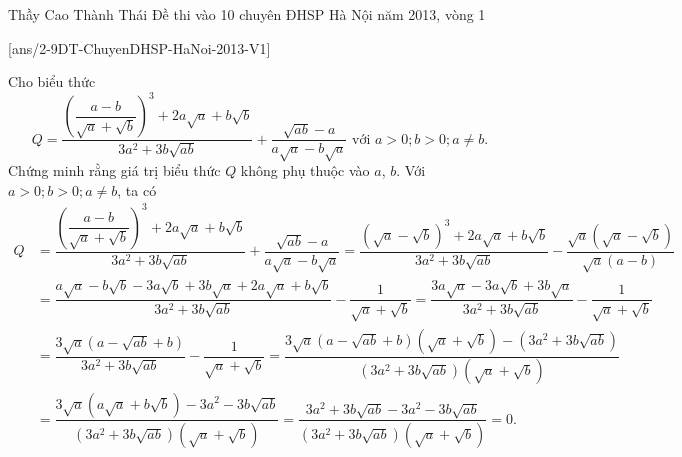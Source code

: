 
\begin{name}
{Thầy  Cao Thành Thái}
{Đề thi vào 10 chuyên ĐHSP Hà Nội năm 2013, vòng 1}
\end{name}
\setcounter{ex}{0}
[ans/2-9DT-ChuyenDHSP-HaNoi-2013-V1]


\begin{ex}%
 Cho biểu thức
 $$Q = \dfrac{\left( \dfrac{a - b}{\sqrt{a} + \sqrt{b}} \right)^3 + 2a \sqrt{a} + b \sqrt{b}}{3a^2 + 3b \sqrt{ab}} + \dfrac{\sqrt{ab} - a}{a \sqrt{a} - b \sqrt{a}}  \text{ với } a > 0; b > 0; a \neq b.$$
 Chứng minh rằng giá trị biểu thức $Q$ không phụ thuộc vào $a$, $b$.
 \loigiai
  {
  Với $a > 0; b > 0; a \neq b$, ta có
  \begin{align*}
   Q & = \dfrac{\left( \dfrac{a - b}{\sqrt{a} + \sqrt{b}} \right)^3 + 2a \sqrt{a} + b \sqrt{b}}{3a^2 + 3b \sqrt{ab}} + \dfrac{\sqrt{ab} - a}{a \sqrt{a} - b \sqrt{a}} = \dfrac{\left( \sqrt{a} - \sqrt{b} \right)^3 + 2a \sqrt{a} + b \sqrt{b}}{3a^2 + 3b \sqrt{ab}} - \dfrac{\sqrt{a} \left( \sqrt{a} - \sqrt{b} \right)}{\sqrt{a} (a - b)} \\
     & = \dfrac{a \sqrt{a} - b \sqrt{b} - 3a \sqrt{b} + 3b \sqrt{a} + 2a \sqrt{a} + b \sqrt{b}}{3a^2 + 3b \sqrt{ab}} - \dfrac{1}{\sqrt{a} + \sqrt{b}} = \dfrac{3a \sqrt{a} - 3a \sqrt{b} + 3b \sqrt{a}}{3a^2 + 3b \sqrt{ab}} - \dfrac{1}{\sqrt{a} + \sqrt{b}} \\
     & = \dfrac{3 \sqrt{a} \left( a - \sqrt{ab} + b \right)}{3a^2 + 3b \sqrt{ab}} - \dfrac{1}{\sqrt{a} + \sqrt{b}} = \dfrac{3 \sqrt{a} \left( a - \sqrt{ab} + b \right) \left( \sqrt{a} + \sqrt{b} \right) - \left( 3a^2 + 3b \sqrt{ab} \right)}{\left( 3a^2 + 3b \sqrt{ab} \right) \left( \sqrt{a} + \sqrt{b} \right)} \\
     & = \dfrac{3 \sqrt{a} \left( a \sqrt{a} + b \sqrt{b} \right) - 3a^2 - 3b \sqrt{ab}}{\left( 3a^2 + 3b \sqrt{ab} \right) \left( \sqrt{a} + \sqrt{b} \right)} = \dfrac{3a^2 + 3b \sqrt{ab} - 3a^2 - 3b \sqrt{ab}}{\left( 3a^2 + 3b \sqrt{ab} \right) \left( \sqrt{a} + \sqrt{b} \right)} = 0.
  \end{align*}
  }
\end{ex}


